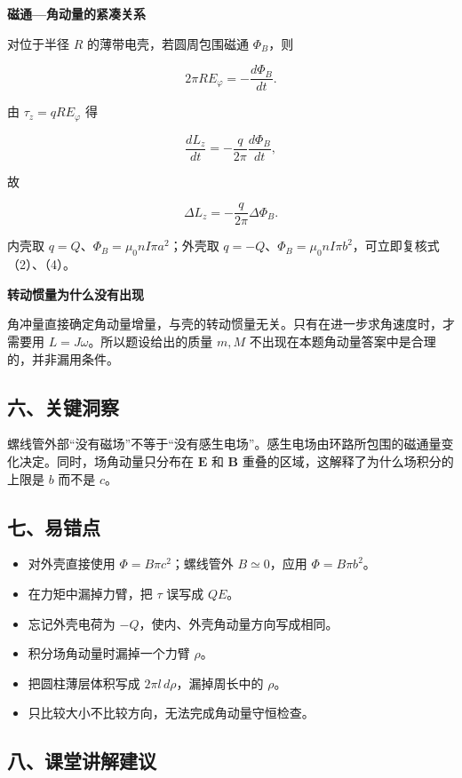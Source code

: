 \documentclass[12pt,a4paper,UTF8]{ctexart}
\newcommand{\tightlist}{\setlength{\itemsep}{0pt}\setlength{\parskip}{0pt}}
\begin{document}
\textbf{磁通---角动量的紧凑关系}

对位于半径 \(R\) 的薄带电壳，若圆周包围磁通 \(\Phi_B\)，则

\[
2\pi R E_\varphi=-\frac{d\Phi_B}{dt}.
\]

由 \(\tau_z=qRE_\varphi\) 得

\[
\frac{dL_z}{dt}=-\frac q{2\pi}\frac{d\Phi_B}{dt},
\]

故

\[
\Delta L_z=-\frac q{2\pi}\Delta\Phi_B.
\]

内壳取 \(q=Q\)、\(\Phi_B=\mu_0nI\pi a^2\)；外壳取
\(q=-Q\)、\(\Phi_B=\mu_0nI\pi b^2\)，可立即复核式（2）、（4）。

\textbf{转动惯量为什么没有出现}

角冲量直接确定角动量增量，与壳的转动惯量无关。只有在进一步求角速度时，才需要用
\(L=J\omega\)。所以题设给出的质量 \(m,M\)
不出现在本题角动量答案中是合理的，并非漏用条件。

\subsection{六、关键洞察}\label{ux516dux5173ux952eux6d1eux5bdf-2}

螺线管外部``没有磁场''不等于``没有感生电场''。感生电场由环路所包围的磁通量变化决定。同时，场角动量只分布在
\(\bm E\) 和 \(\bm B\) 重叠的区域，这解释了为什么场积分的上限是 \(b\)
而不是 \(c\)。

\subsection{七、易错点}\label{ux4e03ux6613ux9519ux70b9-2}

\begin{itemize}
\tightlist
\item
  对外壳直接使用 \(\Phi=B\pi c^2\)；螺线管外 \(B\simeq0\)，应用
  \(\Phi=B\pi b^2\)。
\item
  在力矩中漏掉力臂，把 \(\tau\) 误写成 \(QE\)。
\item
  忘记外壳电荷为 \(-Q\)，使内、外壳角动量方向写成相同。
\item
  积分场角动量时漏掉一个力臂 \(\rho\)。
\item
  把圆柱薄层体积写成 \(2\pi l\,d\rho\)，漏掉周长中的 \(\rho\)。
\item
  只比较大小不比较方向，无法完成角动量守恒检查。
\end{itemize}

\subsection{八、课堂讲解建议}\label{ux516bux8bfeux5802ux8bb2ux89e3ux5efaux8bae-2}
\end{document}
